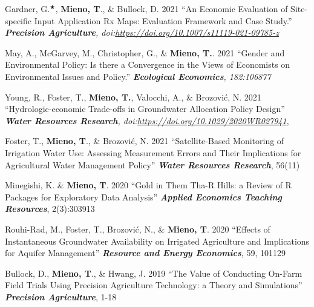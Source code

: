 \documentclass[10pt,margin,line]{res}
\newenvironment{list1}{
  \begin{list}{\ding{113}}{%
      \setlength{\itemsep}{0in}
      \setlength{\parsep}{0in} \setlength{\parskip}{0in}
      \setlength{\topsep}{0in} \setlength{\partopsep}{0in}
      \setlength{\leftmargin}{0.17in}}}{\end{list}}
\begin{document}
\begin{resume}
\begin{list1}
\item[] Gardner, G.$^\bigstar$, \textbf{Mieno, T}., \& Bullock, D. 2021 ``An Economic Evaluation of Site-specific Input Application Rx Maps: Evaluation Framework and Case Study.'' \textit{\textbf{Precision Agriculture}, doi:\url{https://doi.org/10.1007/s11119-021-09785-z}}
\vspace*{0.3cm}

\item[] May, A., McGarvey, M., Christopher, G., \& \textbf{Mieno, T.}. 2021 ``Gender and Environmental Policy: Is there a Convergence in the Views of Economists on Environmental Issues and Policy.'' \textit{\textbf{Ecological Economics}, 182:106877}
\vspace*{0.3cm}

\item[] Young, R., Foster, T., \textbf{Mieno, T.}, Valocchi, A., \& Brozovi\'{c}, N. 2021 ``Hydrologic-economic Trade-offs in Groundwater Allocation Policy Design'' \textit{\textbf{Water Resources Research}, doi:\url{https://doi.org/10.1029/2020WR027941}}, 
\vspace*{0.3cm}

\item[] Foster, T., \textbf{Mieno, T}., \& Brozovi\'{c}, N. 2021 ``Satellite-Based Monitoring of Irrigation Water Use: Assessing Measurement Errors and Their Implications for Agricultural Water Management Policy'' \textit{\textbf{Water Resources Research}}, 56(11)
\vspace*{0.3cm}

\item[] Minegishi, K. \& \textbf{Mieno, T}. 2020
  ``Gold in Them Tha-R Hills: a Review of R Packages for Exploratory Data Analysis'' \textbf{\textit{Applied Economics Teaching Resources}}, 2(3):303913
\vspace*{0.3cm}

\item[] Rouhi-Rad, M., Foster, T., Brozovi\'{c}, N., \& \textbf{Mieno, T}. 2020
  ``Effects of Instantaneous Groundwater Availability on Irrigated Agriculture and Implications for Aquifer Management'' \textbf{\textit{Resource and Energy Economics}}, 59, 101129
\vspace*{0.3cm}

\item[] Bullock, D., \textbf{Mieno, T}., \& Hwang, J. 2019
  ``The Value of Conducting On-Farm Field Trials Using Precision Agriculture Technology: a Theory and Simulations'' \textbf{\textit{Precision Agriculture}}, 1-18
\vspace*{0.3cm}


\end{list1}
\end{resume}
\end{document}
